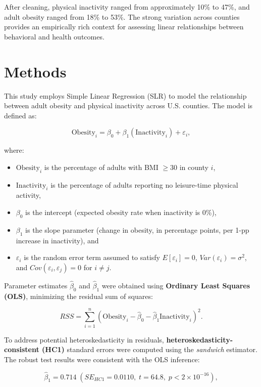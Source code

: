 \documentclass[
  letterpaper,
  DIV=11,
  numbers=noendperiod]{scrartcl}
\providecommand{\tightlist}{%
  \setlength{\itemsep}{0pt}\setlength{\parskip}{0pt}}\usepackage{longtable,booktabs,array}
\begin{document}
After cleaning, physical inactivity ranged from approximately 10\% to
47\%, and adult obesity ranged from 18\% to 53\%. The strong variation
across counties provides an empirically rich context for assessing
linear relationships between behavioral and health outcomes.

\section{Methods}\label{methods}

This study employs Simple Linear Regression (SLR) to model the
relationship between adult obesity and physical inactivity across U.S.
counties. The model is defined as:

\[
\text{Obesity}_i = \beta_0 + \beta_1(\text{Inactivity}_i) + \varepsilon_i,
\]

where:

\begin{itemize}
\tightlist
\item
  \(\text{Obesity}_i\) is the percentage of adults with BMI \(\ge 30\)
  in county \(i\),
\item
  \(\text{Inactivity}_i\) is the percentage of adults reporting no
  leisure-time physical activity,
\item
  \(\beta_0\) is the intercept (expected obesity rate when inactivity is
  0\%),
\item
  \(\beta_1\) is the slope parameter (change in obesity, in percentage
  points, per 1-pp increase in inactivity), and\\
\item
  \(\varepsilon_i\) is the random error term assumed to satisfy
  \(E[\varepsilon_i] = 0\), \(Var(\varepsilon_i) = \sigma^2\), and
  \(Cov(\varepsilon_i, \varepsilon_j) = 0\) for \(i \ne j\).
\end{itemize}

Parameter estimates \(\hat{\beta}_0\) and \(\hat{\beta}_1\) were
obtained using \textbf{Ordinary Least Squares (OLS)}, minimizing the
residual sum of squares:

\[
RSS = \sum_{i=1}^{n} (\text{Obesity}_i - \hat{\beta}_0 - \hat{\beta}_1 \text{Inactivity}_i)^2.
\]

To address potential heteroskedasticity in residuals,
\textbf{heteroskedasticity-consistent (HC1)} standard errors were
computed using the \emph{sandwich} estimator.\\
The robust test results were consistent with the OLS inference:

\[
\hat{\beta}_1 = 0.714 \; (SE_{HC1} = 0.0110, \; t = 64.8, \; p < 2 \times 10^{-16}),
\]
\end{document}
